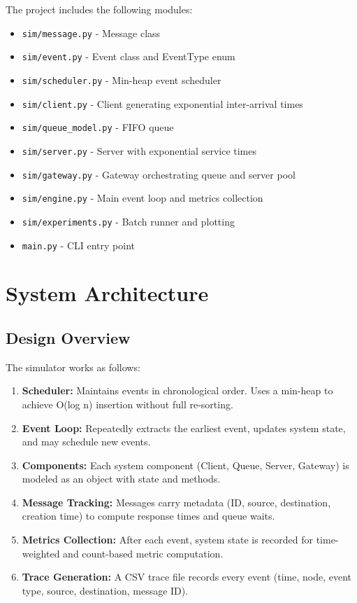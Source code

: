 \documentclass[12pt]{article}
\begin{document}
The project includes the following modules:
\begin{itemize}
    \item \texttt{sim/message.py} - Message class
    \item \texttt{sim/event.py} - Event class and EventType enum
    \item \texttt{sim/scheduler.py} - Min-heap event scheduler
    \item \texttt{sim/client.py} - Client generating exponential inter-arrival times
    \item \texttt{sim/queue\_model.py} - FIFO queue
    \item \texttt{sim/server.py} - Server with exponential service times
    \item \texttt{sim/gateway.py} - Gateway orchestrating queue and server pool
    \item \texttt{sim/engine.py} - Main event loop and metrics collection
    \item \texttt{sim/experiments.py} - Batch runner and plotting
    \item \texttt{main.py} - CLI entry point
\end{itemize}

\section{System Architecture}

\subsection{Design Overview}

The simulator works as follows:

\begin{enumerate}
    \item \textbf{Scheduler:} Maintains events in chronological order. Uses a min-heap to achieve O(log n) insertion without full re-sorting.
    \item \textbf{Event Loop:} Repeatedly extracts the earliest event, updates system state, and may schedule new events.
    \item \textbf{Components:} Each system component (Client, Queue, Server, Gateway) is modeled as an object with state and methods.
    \item \textbf{Message Tracking:} Messages carry metadata (ID, source, destination, creation time) to compute response times and queue waits.
    \item \textbf{Metrics Collection:} After each event, system state is recorded for time-weighted and count-based metric computation.
    \item \textbf{Trace Generation:} A CSV trace file records every event (time, node, event type, source, destination, message ID).
\end{enumerate}
\end{document}

